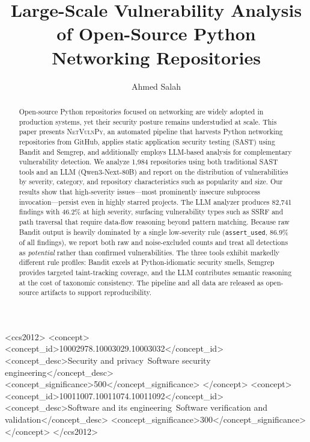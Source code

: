 \documentclass[sigconf,authordraft]{acmart}
\begin{document}
\title{Large-Scale Vulnerability Analysis of Open-Source Python Networking Repositories}

\author{Ahmed Salah}

\renewcommand{\shortauthors}{Ahmed}

\begin{abstract}
Open-source Python repositories focused on networking are widely adopted
in production systems, yet their security posture remains understudied at
scale. This paper presents \textsc{NetVulnPy}, an automated pipeline that
harvests Python networking repositories from GitHub, applies static
application security testing (SAST) using Bandit and Semgrep, and
additionally employs LLM-based analysis for complementary vulnerability
detection. We analyze 1{,}984 repositories using both traditional SAST
tools and an LLM (Qwen3-Next-80B) and report on the distribution of
vulnerabilities by severity, category, and repository characteristics
such as popularity and size. Our results show that high-severity
issues---most prominently insecure subprocess invocation---persist even
in highly starred projects. The LLM analyzer produces 82{,}741 findings
with 46.2\% at high severity, surfacing vulnerability types such as SSRF
and path traversal that require data-flow reasoning beyond pattern
matching. Because raw Bandit output is heavily dominated by a single
low-severity rule (\texttt{assert\_used}, 86.9\% of all findings), we
report both raw and noise-excluded counts and treat all detections as
\emph{potential} rather than confirmed vulnerabilities. The three tools
exhibit markedly different rule profiles: Bandit excels at
Python-idiomatic security smells, Semgrep provides targeted taint-tracking
coverage, and the LLM contributes semantic reasoning at the cost of
taxonomic consistency. The pipeline and all data are released as
open-source artifacts to support reproducibility.
\end{abstract}

\begin{CCSXML}
<ccs2012>
 <concept>
  <concept_id>10002978.10003029.10003032</concept_id>
  <concept_desc>Security and privacy~Software security engineering</concept_desc>
  <concept_significance>500</concept_significance>
 </concept>
 <concept>
  <concept_id>10011007.10011074.10011092</concept_id>
  <concept_desc>Software and its engineering~Software verification and validation</concept_desc>
  <concept_significance>300</concept_significance>
 </concept>
</ccs2012>
\end{CCSXML}
\end{document}
